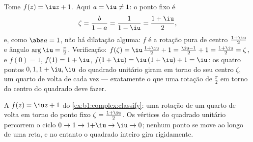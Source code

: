 \begin{example}\label{ex:b1:complex:classify}
Tome $f(z) = \iu z + 1$. Aqui $a = \iu \neq 1$: o ponto fixo é
\[
\zeta = \frac{b}{1 - a} = \frac1{1 - \iu}
= \frac{1 + \iu}{2},
\]
e, como $\abs a = 1$, não há dilatação alguma: $f$ é a rotação
pura de centro $\frac{1+\iu}2$ e ângulo $\arg \iu = \frac\pi2$.
Verificação: $f(\zeta) = \iu\,\frac{1+\iu}2 + 1 = \frac{\iu - 1}2 + 1 =
\frac{1 + \iu}2 = \zeta$, e $f(0) = 1$, $f(1) = 1 + \iu$, $f(1 +
\iu) = \iu\,(1 + \iu) + 1 = \iu$: os quatro pontos $0, 1, 1+\iu, \iu$
do quadrado unitário giram em torno do seu centro $\zeta$, um quarto
de volta de cada vez --- exatamente o que uma rotação de $\frac\pi2$ em
torno do centro do quadrado deve fazer.
\end{example}

\begin{omfigure}

{\small A  $f(z) = \iu z + 1$ do
\cref{ex:b1:complex:classify}: uma rotação de um quarto de volta em torno do
ponto fixo $\zeta = \frac{1+\iu}2$. Os vértices do quadrado unitário
percorrem o ciclo $0 \to 1 \to 1{+}\iu \to \iu \to 0$; nenhum ponto se move
ao longo de uma reta, e no entanto o quadrado inteiro gira rigidamente.}
\end{omfigure}


